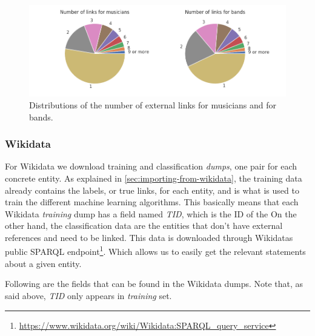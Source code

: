 \documentclass[epsfig,a4paper,11pt,titlepage,twoside,openany]{book}
\newcommand{\footurl}[1]{\footnote{\url{#1}}}
\begin{document}
\begin{figure}[]
  \centering \includegraphics[width=\textwidth]{musicbrainz_number_of_links_musician_band} 
  \caption{Distributions of the number of external links for musicians and for bands.}
  \label{fig:musicbrainz-links-number-pie}
\end{figure}


\subsubsection{Wikidata}
\label{sec:shape-wikidata}


For Wikidata we download training and classification \textit{dumps}, one pair for each concrete entity. As explained in \autoref{sec:importing-from-wikidata}, the training data already contains the labels, or true links, for each entity, and is what is used to train the different machine learning algorithms. This basically means that each Wikidata \textit{training} dump has a field named \textit{TID}, which is the ID of the  On the other hand, the classification data are the entities that don't have external references and need to be linked. This data is downloaded through Wikidatas public SPARQL endpoint\footurl{https://www.wikidata.org/wiki/Wikidata:SPARQL_query_service}. Which allows us to easily get the relevant statements about a given entity.

Following are the fields that can be found in the Wikidata dumps. Note that, as said above, \textit{TID} only appears in \textit{training} set. 
\end{document}
